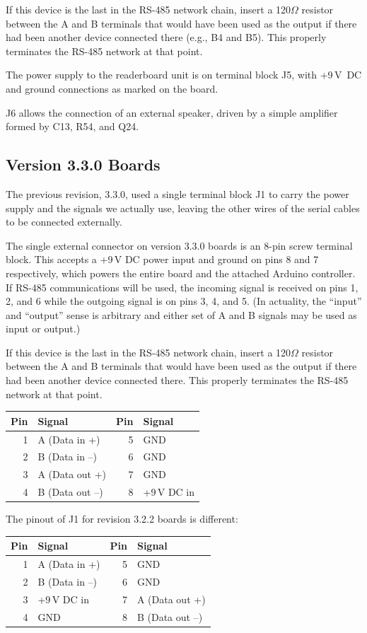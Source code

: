 If this device is the last in the RS-485 network chain, insert a 120$\Omega$ resistor between the A and B terminals
that would have been used as the output if there had been another device connected there (e.g., B4 and B5). This properly terminates
the RS-485 network at that point.

The power supply to the readerboard unit is on terminal block J5, with +9\,V~DC and ground connections as marked
on the board.

J6 allows the connection of an external speaker, driven by a simple amplifier formed by C13, R54, and Q24.

\subsection{Version 3.3.0 Boards}
The previous revision, 3.3.0, used a single terminal block J1 to carry the power supply and the  signals
we actually use, leaving the other wires of the serial cables to be connected externally.

The single external connector on version 3.3.0 boards is an 8-pin screw terminal block. This accepts a +9\,V DC power input
and ground on pins 8 and 7 respectively, which powers the entire board and the attached Arduino controller.  If RS-485
communications will be used, the incoming signal is received on pins 1, 2, and 6 while the outgoing signal is on
pins 3, 4, and 5. (In actuality, the ``input'' and ``output'' sense is arbitrary and either set of A and B signals
may be used as input or output.) 

If this device is the last in the RS-485 network chain, insert a 120$\Omega$ resistor between the A and B terminals
that would have been used as the output if there had been another device connected there. This properly terminates
the RS-485 network at that point.
\begin{center}
	\begin{tabular}{rl|rl}\toprule
		\bfseries Pin & \bfseries Signal &
		\bfseries Pin & \bfseries Signal \\\midrule
		1&A (Data in +)    &5&GND\\
		2&B (Data in --)   &6&GND\\
		3&A (Data out +)   &7&GND\\
		4&B (Data out --)  &8&+9\,V DC in\\\bottomrule
	\end{tabular}
\end{center}

The pinout of J1 for revision 3.2.2 boards is different:
\begin{center}
	\begin{tabular}{rl|rl}\toprule
		\bfseries Pin & \bfseries Signal &
		\bfseries Pin & \bfseries Signal \\\midrule
		1&A (Data in +)    &5&GND\\
		2&B (Data in --)   &6&GND\\
		3&+9\,V DC in      &7&A (Data out +)\\
		4&GND              &8&B (Data out --)\\\bottomrule
	\end{tabular}
\end{center}

